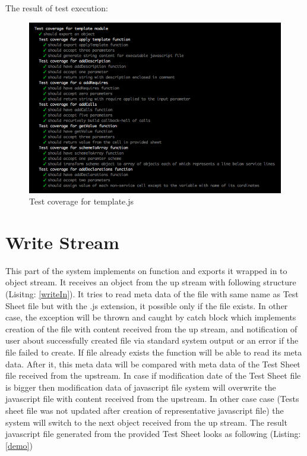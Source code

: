 %

The result of test execution:
\begin{figure}[H]
	\centering
	\includegraphics[width=\linewidth]{grafiken/testTemplate.png}
	\caption{Test coverage for template.js}
	\label{fig:testTemplate}
\end{figure}


\section{Write Stream}

This part of the system implements on function and exports it wrapped in to object stream. It receives an object from the up stream with following structure (Lisitng: \ref{writeIn}). It tries to read meta data of the file with same name as Test Sheet file but with the .js extension, it possible only if the file exists. In other case, the exception will be thrown and caught by catch block which implements creation of the file with content received from the up stream, and notification of user about successfully created file via standard system output or an error if the file failed to create. If file already exists the function will be able to read its meta data. After it, this meta data will be compared with meta data of the Test Sheet file received from the upstream. In case if modification date of the Test Sheet file is bigger then modification data of javascript file system will overwrite the javascript file with content received from the upstream. In other case case (Tests sheet file was not updated after creation of representative javascript file) the system will switch to the next object received from the up stream. The result javascript file generated from the provided Test Sheet looks as following (Listing: \ref{demo})

